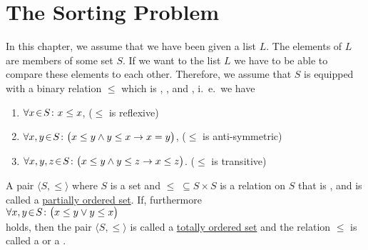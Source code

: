 \section{The Sorting Problem}
In this chapter, we assume that we have been given a list $L$.  The elements of $L$ are members of
some set $S$.  If we want to  the list $L$ we have to be able to compare these elements
to each other.   Therefore, we assume that $S$ is equipped with a binary relation $\leq$ which is
, , and
, i.~e.~we have   
\begin{enumerate}
\item $\forall x \!\in\! S \colon x \leq x$,                      \hspace*{\fill} ($\leq$ is reflexive)
\item $\forall x, y \!\in\! S \colon \bigl(x \leq y \wedge y \leq x
  \rightarrow x = y\bigr)$,   \hspace*{\fill} ($\leq$ is anti-symmetric)
\item $\forall x, y, z \!\in\! S \colon \bigl(x \leq y \wedge y \leq z \rightarrow x \leq z\bigr)$.  \hspace*{\fill} ($\leq$ is transitive)
\end{enumerate}
\begin{Definition} 
  A pair $\langle S, \leq \rangle$ where $S$ is a set and $\leq \;\subseteq S \times S$ is a relation
  on $S$ that is ,  and  is called a
  \href{http://en.wikipedia.org/wiki/Partially_ordered_set}{partially ordered set}.  
  If, furthermore
  \\[0.2cm]
  \hspace*{1.3cm}
  $\forall x, y \!\in\! S \colon\bigl( x \leq y \vee y \leq x\bigr)$
  \\[0.2cm]
  holds, then the pair $\langle S, \leq \rangle$ is called a 
  \href{http://en.wikipedia.org/wiki/Totally_ordered_set}{totally ordered set} and
  the relation $\leq$ is called a  or a . \eox
\end{Definition}

